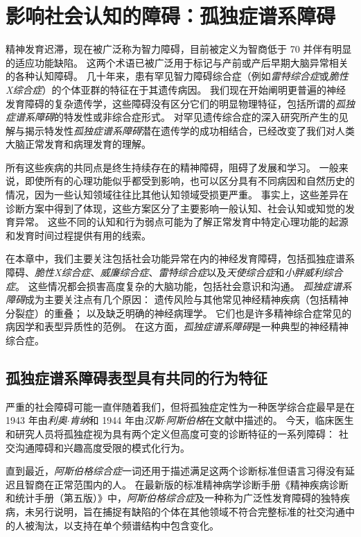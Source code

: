 \chapter{影响社会认知的障碍：孤独症谱系障碍} \label{chap:chap62}

精神发育迟滞，现在被广泛称为智力障碍，目前被定义为智商低于 70 并伴有明显的适应功能缺陷。
这两个术语已被广泛用于标记与产前或产后早期大脑异常相关的各种认知障碍。
几十年来，患有罕见智力障碍综合症（例如\textit{雷特综合症}或\textit{脆性X综合症}）的个体亚群的特征在于其遗传病因。
我们现在开始阐明更普遍的神经发育障碍的复杂遗传学，这些障碍没有区分它们的明显物理特征，包括所谓的\textit{孤独症谱系障碍}的特发性或非综合症形式。
对罕见遗传综合症的深入研究所产生的见解与揭示特发性\textit{孤独症谱系障碍}潜在遗传学的成功相结合，已经改变了我们对人类大脑正常发育和病理发育的理解。


所有这些疾病的共同点是终生持续存在的精神障碍，阻碍了发展和学习。
一般来说，即使所有的心理功能似乎都受到影响，也可以区分具有不同病因和自然历史的情况，因为一些认知领域往往比其他认知领域受损更严重。
事实上，这些差异在诊断方案中得到了体现，这些方案区分了主要影响一般认知、社会认知或知觉的发育异常。
这些不同的认知和行为弱点可能为了解正常发育中特定心理功能的起源和发育时间过程提供有用的线索。


在本章中，我们主要关注包括社会功能异常在内的神经发育障碍，包括孤独症谱系障碍、\textit{脆性X综合症}、\textit{威廉综合症}、\textit{雷特综合症}以及\textit{天使综合症}和\textit{小胖威利综合症}。
这些情况都会损害高度复杂的大脑功能，包括社会意识和沟通。
\textit{孤独症谱系障碍}成为主要关注点有几个原因：
遗传风险与其他常见神经精神疾病（包括精神分裂症）的重叠；
以及缺乏明确的神经病理学。
它们也是许多精神综合症常见的病因学和表型异质性的范例。
在这方面，\textit{孤独症谱系障碍}是一种典型的神经精神综合症。



\section{孤独症谱系障碍表型具有共同的行为特征}

严重的社会障碍可能一直伴随着我们，但将孤独症定性为一种医学综合症最早是在 1943 年由\textit{利奥$\cdot$肯纳}和 1944 年由\textit{汉斯$\cdot$阿斯伯格}在文献中描述的。
今天，临床医生和研究人员将孤独症视为具有两个定义但高度可变的诊断特征的一系列障碍：
社交沟通障碍和兴趣高度受限的模式化行为。


直到最近，\textit{阿斯伯格综合症}一词还用于描述满足这两个诊断标准但语言习得没有延迟且智商在正常范围内的人。
在最新版的标准精神病学诊断手册《精神疾病诊断和统计手册（第五版）》中，\textit{阿斯伯格综合症}及一种称为广泛性发育障碍的独特疾病，未另行说明，旨在捕捉有缺陷的个体在其他领域不符合完整标准的社交沟通中的人被淘汰，以支持在单个频谱结构中包含变化。


